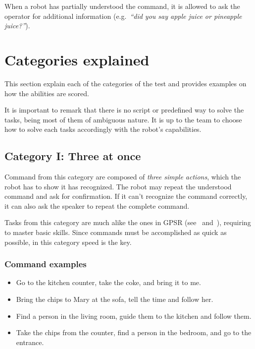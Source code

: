 When a robot has partially understood the command, it is allowed to ask the operator for additional information (e.g.~\textit{\enquote{did you say apple juice or pineapple juice?}}).

%
%
\section{Categories explained}
\label{sec:eegpsr-categories-explained}
This section explain each of the categories of the test and provides examples on how the abilities are scored.

It is important to remark that there is no script or predefined way to solve the tasks, being most of them of ambiguous nature. It is up to the team to choose how to solve each tasks accordingly with the robot's capabilities.



%
%
\subsection{Category I: Three at once}
\label{sec:eegpsr-category1-explained}
Command from this category are composed of \textit{three simple actions}, which the robot has to show it has recognized. The robot may repeat the understood command and ask for confirmation. If it can't recognize the command correctly, it can also ask the speaker to repeat the complete command.

Tasks from this category are much alike the ones in GPSR (see~ and~), requiring to master basic skills. Since commands must be accomplished as quick as possible, in this category speed is the key.

\subsubsection{Command examples}
\begin{itemize}
	\item Go to the kitchen counter, take the coke, and bring it to me.
	\item Bring the chips to Mary at the sofa, tell the time and follow her.
	\item Find a person in the living room, guide them to the kitchen and follow them.
	\item Take the chips from the counter, find a person in the bedroom, and go to the entrance.
\end{itemize}


